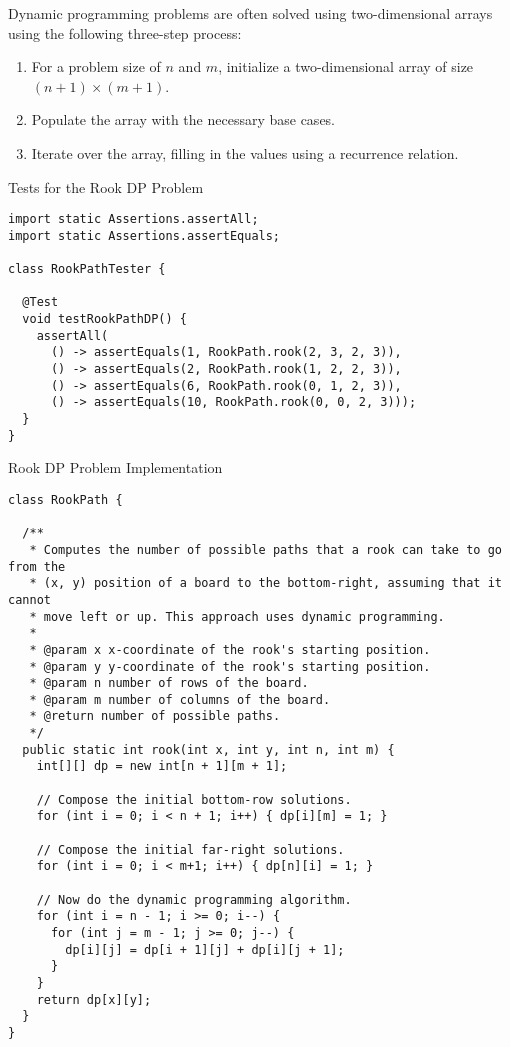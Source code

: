 Dynamic programming problems are often solved using two-dimensional arrays using the following three-step process: 

\begin{enumerate}
  \item For a problem size of $n$ and $m$, initialize a two-dimensional array of size $(n + 1) \times (m + 1)$.
  \item Populate the array with the necessary base cases.
  \item Iterate over the array, filling in the values using a recurrence relation.
\end{enumerate}

\begin{cl}{Tests for the Rook DP Problem}
\begin{lstlisting}[language=MyJava]
import static Assertions.assertAll;
import static Assertions.assertEquals;

class RookPathTester {

  @Test
  void testRookPathDP() {
    assertAll(
      () -> assertEquals(1, RookPath.rook(2, 3, 2, 3)),
      () -> assertEquals(2, RookPath.rook(1, 2, 2, 3)),
      () -> assertEquals(6, RookPath.rook(0, 1, 2, 3)),
      () -> assertEquals(10, RookPath.rook(0, 0, 2, 3)));
  }
}
\end{lstlisting}
\end{cl}

\begin{cl}{Rook DP Problem Implementation}
\begin{lstlisting}[language=MyJava]
class RookPath {

  /**
   * Computes the number of possible paths that a rook can take to go from the
   * (x, y) position of a board to the bottom-right, assuming that it cannot
   * move left or up. This approach uses dynamic programming.
   * 
   * @param x x-coordinate of the rook's starting position.
   * @param y y-coordinate of the rook's starting position.
   * @param n number of rows of the board.
   * @param m number of columns of the board.
   * @return number of possible paths.
   */
  public static int rook(int x, int y, int n, int m) {
    int[][] dp = new int[n + 1][m + 1];

    // Compose the initial bottom-row solutions.
    for (int i = 0; i < n + 1; i++) { dp[i][m] = 1; }

    // Compose the initial far-right solutions.
    for (int i = 0; i < m+1; i++) { dp[n][i] = 1; }

    // Now do the dynamic programming algorithm.
    for (int i = n - 1; i >= 0; i--) {
      for (int j = m - 1; j >= 0; j--) {
        dp[i][j] = dp[i + 1][j] + dp[i][j + 1];
      }
    }
    return dp[x][y];
  }
}
\end{lstlisting}
\end{cl}

